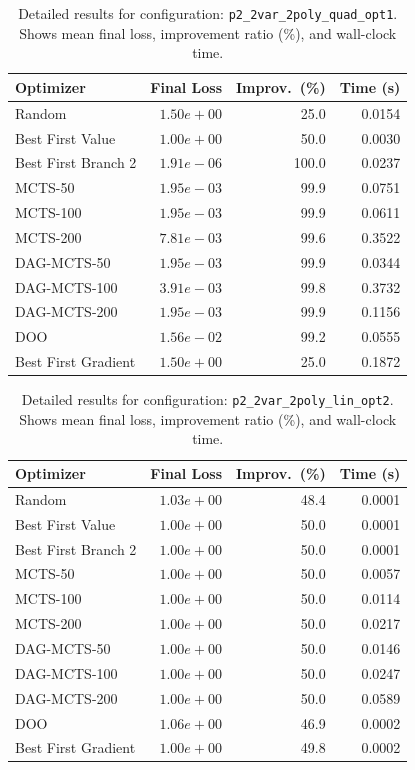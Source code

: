 \begin{table}[H]
\centering
\caption{Detailed results for configuration: \texttt{p2\_2var\_2poly\_quad\_opt1}. Shows mean final loss, improvement ratio (\%), and wall-clock time.}
\label{tab:abssum-detail-6}
\begin{tabular}{lrrr}
\toprule
Optimizer & Final Loss & Improv.~(\%) & Time (s) \\
\midrule
Random & $1.50e+00$ & 25.0 & 0.0154 \\
\hline
Best First Value & $1.00e+00$ & 50.0 & 0.0030 \\
\hline
Best First Branch 2 & \textbf{$1.91e-06$} & 100.0 & 0.0237 \\
\hline
MCTS-50 & $1.95e-03$ & 99.9 & 0.0751 \\
\hline
MCTS-100 & $1.95e-03$ & 99.9 & 0.0611 \\
\hline
MCTS-200 & $7.81e-03$ & 99.6 & 0.3522 \\
\hline
DAG-MCTS-50 & $1.95e-03$ & 99.9 & 0.0344 \\
\hline
DAG-MCTS-100 & $3.91e-03$ & 99.8 & 0.3732 \\
\hline
DAG-MCTS-200 & $1.95e-03$ & 99.9 & 0.1156 \\
\hline
DOO & $1.56e-02$ & 99.2 & 0.0555 \\
\hline
Best First Gradient & $1.50e+00$ & 25.0 & 0.1872 \\
\bottomrule
\end{tabular}
\end{table}

\begin{table}[H]
\centering
\caption{Detailed results for configuration: \texttt{p2\_2var\_2poly\_lin\_opt2}. Shows mean final loss, improvement ratio (\%), and wall-clock time.}
\label{tab:abssum-detail-7}
\begin{tabular}{lrrr}
\toprule
Optimizer & Final Loss & Improv.~(\%) & Time (s) \\
\midrule
Random & $1.03e+00$ & 48.4 & 0.0001 \\
\hline
Best First Value & \textbf{$1.00e+00$} & 50.0 & 0.0001 \\
\hline
Best First Branch 2 & \textbf{$1.00e+00$} & 50.0 & 0.0001 \\
\hline
MCTS-50 & \textbf{$1.00e+00$} & 50.0 & 0.0057 \\
\hline
MCTS-100 & \textbf{$1.00e+00$} & 50.0 & 0.0114 \\
\hline
MCTS-200 & \textbf{$1.00e+00$} & 50.0 & 0.0217 \\
\hline
DAG-MCTS-50 & \textbf{$1.00e+00$} & 50.0 & 0.0146 \\
\hline
DAG-MCTS-100 & \textbf{$1.00e+00$} & 50.0 & 0.0247 \\
\hline
DAG-MCTS-200 & \textbf{$1.00e+00$} & 50.0 & 0.0589 \\
\hline
DOO & $1.06e+00$ & 46.9 & 0.0002 \\
\hline
Best First Gradient & $1.00e+00$ & 49.8 & 0.0002 \\
\bottomrule
\end{tabular}
\end{table}

